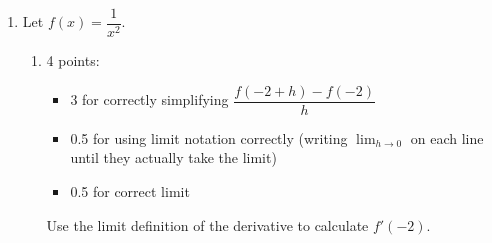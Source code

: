 \documentclass{article}
\begin{document}
\begin{enumerate}
\begin{enumerate}
\begin{solution}
    \end{solution}

  \end{enumerate}

\item  Let $f(x) = \dfrac{1}{x^2} $. 

  \begin{enumerate} 

  \item

    \begin{grading} 
      4 points:
      \begin{itemize}[nosep]
      \item 3 for correctly simplifying $\dfrac{ f(-2+h) - f(-2) }{h}$
      \item 0.5 for using limit notation correctly (writing $\displaystyle \lim_{h \to 0}$ on each line until they actually take the limit)
      \item 0.5 for correct limit 
      \end{itemize}
    \end{grading} 

    \begin{problem}[\nstretch{1.5}]
      Use the limit definition of the derivative to calculate $f'(-2)$.
    \end{problem}


\end{enumerate}
\end{enumerate}
\end{document}
